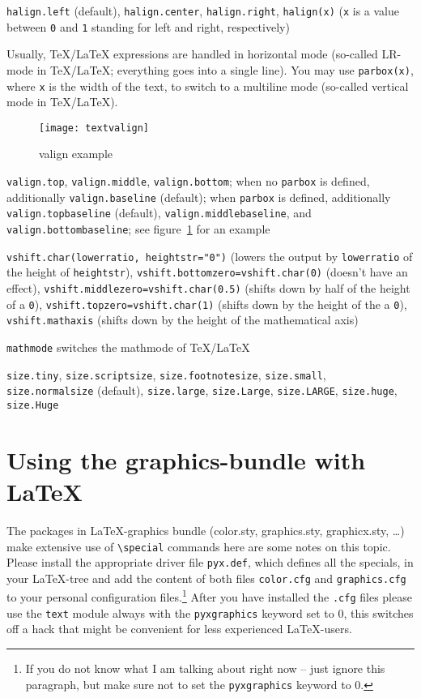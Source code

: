 \begin{description}
\raggedright
\item[Horizontal alignment:] \verb|halign.left| (default),
\verb|halign.center|, \verb|halign.right|, \verb|halign(x)| (\verb|x|
is a value between \verb|0| and \verb|1| standing for left and right,
respectively)
\item[Vertical box:] Usually, \TeX/\LaTeX{} expressions are handled in
horizontal mode (so-called LR-mode in \TeX/\LaTeX; everything goes
into a single line). You may use \verb|parbox(x)|, where \verb|x| is the
width of the text, to switch to a multiline mode (so-called vertical
mode in \TeX/\LaTeX).
\begin{figure}
\centerline{\texttt{[image: textvalign]}}
\caption{valign example}
\label{fig:textvalign}
\end{figure}
\item[Vertical alignment:] \verb|valign.top|, \verb|valign.middle|,
\verb|valign.bottom|; when no \verb|parbox| is defined, additionally
\verb|valign.baseline| (default); when \verb|parbox| is defined,
additionally \verb|valign.topbaseline| (default),
\verb|valign.middlebaseline|, and \verb|valign.bottombaseline|; see
figure~\ref{fig:textvalign} for an example
\item[Vertical shift:] \verb|vshift.char(lowerratio, heightstr="0")|
(lowers the output by \verb|lowerratio| of the height of
\verb|heightstr|), \verb|vshift.bottomzero=vshift.char(0)| (doesn't
have an effect), \verb|vshift.middlezero=vshift.char(0.5)| (shifts
down by half of the height of a \verb|0|),
\verb|vshift.topzero=vshift.char(1)| (shifts down by the height of the a
\verb|0|), \verb|vshift.mathaxis| (shifts down by the height of the
mathematical axis)
\item[Mathmode:] \verb|mathmode| switches the mathmode of \TeX/\LaTeX
\item[Font size:] \verb|size.tiny|, \verb|size.scriptsize|,
\verb|size.footnotesize|, \verb|size.small|, \verb|size.normalsize|
(default), \verb|size.large|, \verb|size.Large|, \verb|size.LARGE|,
\verb|size.huge|, \verb|size.Huge|
\end{description}

\section{Using the graphics-bundle with \LaTeX}

The packages in \LaTeX-graphics bundle (color.sty, graphics.sty,
graphicx.sty, \ldots) make extensive use of \verb|\special| commands here
are some notes on this topic. Please install the appropriate driver file
\verb|pyx.def|, which defines all the specials, in your \LaTeX-tree and add
the content of both files \verb|color.cfg| and \verb|graphics.cfg| to your
personal configuration files.\footnote{If you do not know what I am talking about
right now -- just ignore this paragraph, but make sure not to set the
\texttt{pyxgraphics} keyword to 0.} After you have installed the \verb|.cfg|
files please use the \verb|text| module always with the \verb|pyxgraphics|
keyword set to 0, this switches off a hack that might be convenient for less
experienced \LaTeX-users.\medskip

